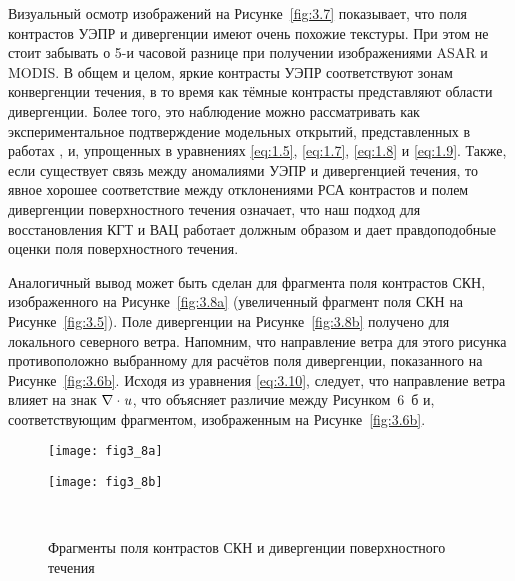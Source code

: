 {Визуальный осмотр изображений на Рисунке~\ref{fig:3.7} показывает, что поля контрастов УЭПР и дивергенции имеют очень похожие текстуры. При этом не стоит забывать о 5-и часовой разнице при получении изображениями ASAR и MODIS. В общем и целом, яркие контрасты УЭПР соответствуют зонам конвергенции течения, в то время как тёмные контрасты представляют области дивергенции. Более того, это наблюдение можно рассматривать как экспериментальное подтверждение модельных открытий, представленных в работах \citep{Kudryavtsev2005,Johannessen2005}, и, упрощенных в уравнениях \eqref{eq:1.5}, \eqref{eq:1.7}, \eqref{eq:1.8} и \eqref{eq:1.9}. Также, если существует связь между аномалиями УЭПР и дивергенцией течения, то явное хорошее соответствие между отклонениями РСА контрастов и полем дивергенции поверхностного течения означает, что наш подход для восстановления КГТ и ВАЦ работает должным образом и дает правдоподобные оценки поля поверхностного течения.

Аналогичный вывод может быть сделан для фрагмента поля контрастов СКН, изображенного на Рисунке~\ref{fig:3.8a} (увеличенный фрагмент поля СКН на Рисунке~\ref{fig:3.5}). Поле дивергенции на Рисунке~\ref{fig:3.8b} получено для локального северного ветра. Напомним, что направление ветра для этого рисунка противоположно выбранному для расчётов поля дивергенции, показанного на Рисунке~\ref{fig:3.6b}. Исходя из уравнения \eqref{eq:3.10}, следует, что направление ветра влияет на знак $\nabla \cdot {\it u}$, что объясняет различие между Рисунком~6~б и, соответствующим фрагментом, изображенным на Рисунке~\ref{fig:3.6b}.



\begin{figure}[H]
   	\centering
	\begin{minipage}{.47\textwidth}
	    \subcaptionbox{\label{fig:3.8a}}
		{\texttt{[image: fig3\_8a]}}
	\end{minipage}
	\hfill
	\begin{minipage}{.47\textwidth}
	    \subcaptionbox{\label{fig:3.8b}}
		{\texttt{[image: fig3\_8b]}}
	\end{minipage}
    \\
    \caption{Фрагменты поля контрастов СКН и дивергенции поверхностного течения}
    \label{fig:3.8}
\end{figure}


}
